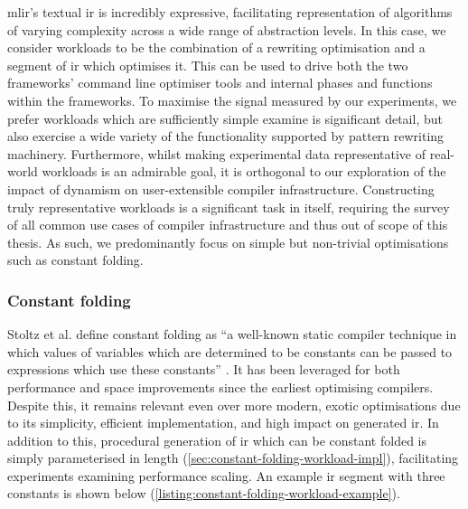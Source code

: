\ac{mlir}'s textual \ac{ir} is incredibly expressive, facilitating representation of algorithms of varying complexity across a wide range of abstraction levels.
In this case, we consider workloads to be the combination of a rewriting optimisation and a segment of \ac{ir} which optimises it. This can be used to drive both the two frameworks' command line optimiser tools and internal phases and functions within the frameworks.
To maximise the signal measured by our experiments, we prefer workloads which are sufficiently simple examine is significant detail, but also exercise a wide variety of the functionality supported by %
pattern rewriting machinery.
Furthermore, whilst making experimental data representative of real-world workloads is an admirable goal, it is orthogonal to our exploration of the impact of dynamism on user-extensible compiler infrastructure.
Constructing truly representative workloads is a significant task in itself, requiring the survey of all common use cases of compiler infrastructure and thus out of scope of this thesis.
As such, we predominantly focus on simple but non-trivial optimisations such as constant folding.

\subsubsection{Constant folding}
\label{sssec:experimental-workload-constant-folding}

Stoltz et al. define constant folding as ``a well-known static compiler technique in which values of variables which are determined to be constants can be passed to expressions which use these constants'' \cite{stoltzConstantPropagationFresh1994}.
It has been leveraged for both performance and space improvements since the earliest optimising compilers. Despite this, it remains relevant even over more modern, exotic optimisations due to its simplicity, efficient implementation, and high impact on generated \ac{ir}.
In addition to this, procedural generation of \ac{ir} which can be constant folded is simply parameterised in length (\autoref{sec:constant-folding-workload-impl}), facilitating experiments examining performance scaling.
An example \ac{ir} segment with three constants is shown below (\autoref{listing:constant-folding-workload-example}).

